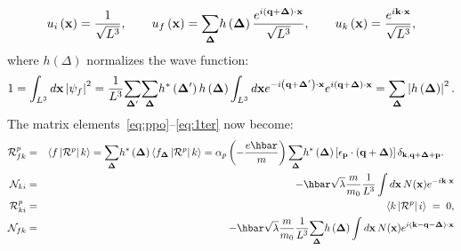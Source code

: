 \documentclass[12pt,onecolumn,amssymb,nofootinbib]{revtex4-2} %
\begin{document}
\begin{equation}
u_{i}\left(\mathbf{x}\right)=\frac{1}{\sqrt{L^{3}}},\qquad
u_{f}\left(\mathbf{x}\right)=\underset{\bf \Delta}{\sum}h\left({\bf \Delta}\right)
\frac{e^{i\left(\mathbf{q+\Delta}\right)\cdot\mathbf{x}}}{\sqrt{L^{3}}},\qquad
u_{k}\left(\mathbf{x}\right)=\frac{e^{i\mathbf{k}\cdot\mathbf{x}}}{\sqrt{L^{3}}},
\end{equation}
where $h\left(\Delta\right)$ normalizes the wave function:
\begin{equation}
1=\int_{L^3} d\mathbf{x}\left|\psi_{f}\right|^{2}=\frac{1}{L^{3}}
\underset{{\bf \Delta}'}{\sum}\underset{\bf \Delta}{\sum}h^{*}
\left({\bf \Delta}'\right)h\left({\bf \Delta}\right)\int_{L^3} d\mathbf{x}
e^{-i\left(\mathbf{q+\Delta'}\right)\cdot\mathbf{x}}
e^{i\left(\mathbf{q+\Delta}\right)\cdot\mathbf{x}}=
\underset{\bf \Delta}{\sum}\left|h\left({\bf \Delta}\right)\right|^{2}.
\end{equation}
The matrix elements~\eqref{eq:ppo}--\eqref{eq:1ter} now become:
\begin{eqnarray}
{\mathcal R}_{fk}^{p} & = & \left\langle f\left|{\mathcal R}^{p}\right|k\right\rangle =
\underset{\bf \Delta}{\sum}h^{*}\left({\bf \Delta}\right)\left\langle
f_{\bf \Delta}\left|{\mathcal R}^{p}\right|k\right\rangle
=\alpha_{p}\left(-\frac{e\hbar}{m}\right)\underset{\bf \Delta}
{\sum}h^{*}\left({\bf \Delta}\right)\left[\mathbf{\epsilon_{p}}\cdot
\left(\mathbf{q+\Delta}\right)\right]\delta_{\mathbf{k,q+\Delta+p}}.\quad \label{eq:fdgdfg} \\
{\mathcal N}_{ki} & = & -\hbar \sqrt{\lambda} \frac{m}{m_0} \frac{1}{L^3} \int d {\bf x} \, N({\bf x}) e^{-i {\bf k}\cdot {\bf x}} \\
{\mathcal R}_{ki}^{p} & = & \left\langle k\left|{\mathcal R}^{p}\right|i\right\rangle \; = \;
0, \\
{\mathcal N}_{fk} & = & -\hbar \sqrt{\lambda} \frac{m}{m_0} \frac{1}{L^3} \underset{\bf \Delta}{\sum}h\left({\bf \Delta}\right) \int d {\bf x} \, N({\bf x}) e^{i ({\bf k} - {\bf q} - {\bf \Delta}) \cdot {\bf x}}  \label{eq:1ter2}
\end{eqnarray}
\end{document}
